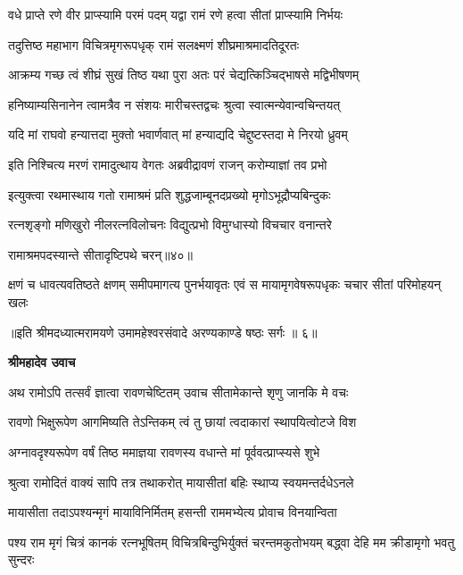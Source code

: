 \twolineshloka
{वधे प्राप्ते रणे वीर प्राप्स्यामि परमं पदम्}
{यद्वा रामं रणे हत्वा सीतां प्राप्स्यामि निर्भयः} %

\twolineshloka
{तदुत्तिष्ठ महाभाग विचित्रमृगरूपधृक्}
{रामं सलक्ष्मणं शीघ्रमाश्रमादतिदूरतः} %

\twolineshloka
{आक्रम्य गच्छ त्वं शीघ्रं सुखं तिष्ठ यथा पुरा}
{अतः परं चेद्यत्किञ्चिद्भाषसे मद्विभीषणम्} %

\twolineshloka
{हनिष्याम्यसिनानेन त्वामत्रैव न संशयः}
{मारीचस्तद्वचः श्रुत्वा स्वात्मन्येवान्वचिन्तयत्} %

\twolineshloka
{यदि मां राघवो हन्यात्तदा मुक्तो भवार्णवात्}
{मां हन्याद्यदि चेद्दुष्टस्तदा मे निरयो ध्रुवम्} %

\twolineshloka
{इति निश्चित्य मरणं रामादुत्थाय वेगतः}
{अब्रवीद्रावणं राजन् करोम्याज्ञां तव प्रभो} %

\twolineshloka
{इत्युक्त्वा रथमास्थाय गतो रामाश्रमं प्रति}
{शुद्धजाम्बूनदप्रख्यो मृगोऽभूद्रौप्यबिन्दुकः} %

\twolineshloka
{रत्नशृङ्गो मणिखुरो नीलरत्नविलोचनः}
{विद्युत्प्रभो विमुग्धास्यो विचचार वनान्तरे} %

{रामाश्रमपदस्यान्ते सीतादृष्टिपथे चरन्॥४०॥} %


\fourlineindentedshloka
{क्षणं च धावत्यवतिष्ठते क्षणम्}
{समीपमागत्य पुनर्भयावृतः}
{एवं स मायामृगवेषरूपधृकः}
{चचार सीतां परिमोहयन् खलः} %

{॥इति श्रीमदध्यात्मरामयणे उमामहेश्वरसंवादे
अरण्यकाण्डे षष्ठः सर्गः ॥ ६॥
}




\textbf{श्रीमहादेव उवाच}

\twolineshloka
{अथ रामोऽपि तत्सर्वं ज्ञात्वा रावणचेष्टितम्}
{उवाच सीतामेकान्ते शृणु जानकि मे वचः} %

\twolineshloka
{रावणो भिक्षुरूपेण आगमिष्यति तेऽन्तिकम्}
{त्वं तु छायां त्वदाकारां स्थापयित्वोटजे विश} %

\twolineshloka
{अग्नावदृश्यरूपेण वर्षं तिष्ठ ममाज्ञया}
{रावणस्य वधान्ते मां पूर्ववत्प्राप्स्यसे शुभे} %

\twolineshloka
{श्रुत्वा रामोदितं वाक्यं सापि तत्र तथाकरोत्}
{मायासीतां बहिः स्थाप्य स्वयमन्तर्दधेऽनले} %

\twolineshloka
{मायासीता तदाऽपश्यन्मृगं मायाविनिर्मितम्}
{हसन्ती राममभ्येत्य प्रोवाच विनयान्विता} %

\threelineshloka
{पश्य राम मृगं चित्रं कानकं रत्नभूषितम्}
{विचित्रबिन्दुभिर्युक्तं चरन्तमकुतोभयम्}
{बद्ध्वा देहि मम क्रीडामृगो भवतु सुन्दरः} %

